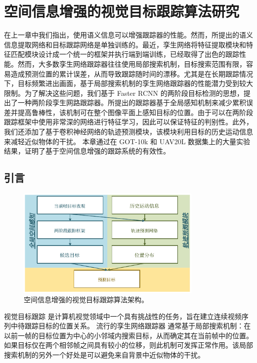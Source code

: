 \chapter{空间信息增强的视觉目标跟踪算法研究}\label{chap:globally}
在上一章中我们指出，使用语义信息可以增强跟踪器的性能。然而，所提出的语义信息提取网络和目标跟踪网络是单独训练的。最近，孪生网络将特征提取模块和特征匹配模块设计成一个统一的框架并执行端到端训练，已经取得了出色的跟踪性能。然而，大多数孪生网络跟踪器往往使用局部搜索机制，目标搜索范围有限，容易造成预测位置的累计误差，从而导致跟踪随时间的漂移。尤其是在长期跟踪情况下，目标频繁进出画面，基于局部搜索机制的孪生网络跟踪器的性能潜力受到较大限制。为了解决这些问题，我们基于 Faster RCNN \cite{ren2015faster} 的两阶段目标检测的思想，提出了一种两阶段孪生网路跟踪器。所提出的跟踪器基于全局感知机制来减少累积误差并提高鲁棒性，该机制可在整个图像平面上感知目标的位置。由于可以在两阶段跟踪框架中使用非常深的网络进行特征学习，因此可以保证特征的判别性。此外，我们还添加了基于卷积神经网络的轨迹预测模块，该模块利用目标的历史运动信息来减轻近似物体的干扰。
本章通过在 GOT-10k \cite{GOT-10k} 和 UAV20L \cite{mueller2016benchmark} 数据集上的大量实验结果，证明了基于空间信息增强的跟踪系统的有效性。

\section{引言}

\begin{figure}[t]
	\centering
    \includegraphics[width=0.8\textwidth]{Img/globally/Arch7.pdf}
    \caption{空间信息增强的视觉目标跟踪算法架构。}
\end{figure}

视觉目标跟踪 \cite{Leang2018OnlineFO, Wang2019VisualOT, Zhang2018UsingFL} 是计算机视觉领域中一个具有挑战性的任务，旨在建立连续视频序列中待跟踪目标的位置关系。
流行的孪生网络跟踪器 \cite{SiamFC, SiamRPN, Wang2018SiamMask} 通常基于局部搜索机制：在以前一帧的目标位置为中心的小邻域内搜索目标，从而确定其在当前帧中的位置。
如果目标仅在两个相邻帧之间具有较小的位移，则此机制可发挥正常作用。该局部搜索机制的另外一个好处是可以避免来自背景中近似物体的干扰。

